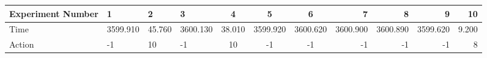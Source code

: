 \documentclass[8pt]{article}
\begin{document}
\begin{landscape}
\begin{tabular}{ | l | l | l | l | c | c | c | r | r | r | r | }
 \hline 
Experiment Number & 1 & 2 & 3 & 4 & 5 & 6 & 7 & 8 & 9 & 10\\ \hline
Time & 3599.910 & 45.760 & 3600.130 & 38.010 & 3599.920 & 3600.620 & 3600.900 & 3600.890 & 3599.620 & 9.200\\ \hline
Action & -1 & 10 & -1 & 10 & -1 & -1 & -1 & -1 & -1 & 8\\ \hline\end{tabular}
\end{landscape}
\end{document}
